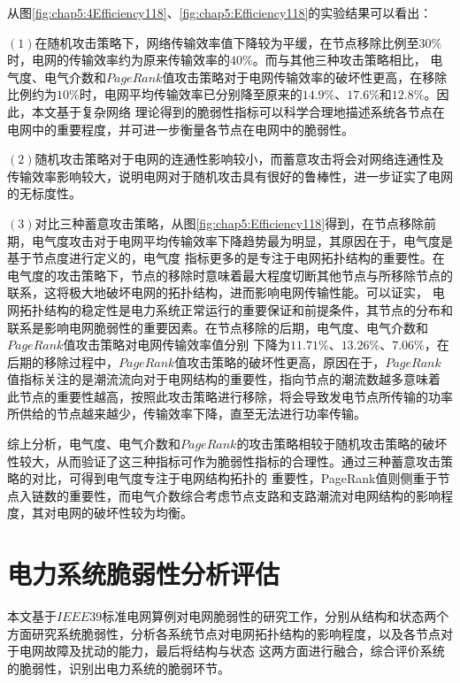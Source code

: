从图\ref{fig:chap5:4Efficiency118}、\ref{fig:chap5:Efficiency118}的实验结果可以看出：

$(1)$在随机攻击策略下，网络传输效率值下降较为平缓，在节点移除比例至$30\%$时，电网的传输效率约为原来传输效率的$40\%$。而与其他三种攻击策略相比，
电气度、电气介数和$PageRank$值攻击策略对于电网传输效率的破坏性更高，在移除比例约为$10\%$时，电网平均传输效率已分别降至原来的$14.9\%$、$17.6\%$和$12.8\%$。因此，本文基于复杂网络
理论得到的脆弱性指标可以科学合理地描述系统各节点在电网中的重要程度，并可进一步衡量各节点在电网中的脆弱性。

$(2)$随机攻击策略对于电网的连通性影响较小，而蓄意攻击将会对网络连通性及传输效率影响较大，说明电网对于随机攻击具有很好的鲁棒性，进一步证实了电网的无标度性。

$(3)$对比三种蓄意攻击策略，从图\ref{fig:chap5:Efficiency118}得到，在节点移除前期，电气度攻击对于电网平均传输效率下降趋势最为明显，其原因在于，电气度是基于节点度进行定义的，电气度
指标更多的是专注于电网拓扑结构的重要性。在电气度的攻击策略下，节点的移除时意味着最大程度切断其他节点与所移除节点的联系，这将极大地破坏电网的拓扑结构，进而影响电网传输性能。可以证实，
电网拓扑结构的稳定性是电力系统正常运行的重要保证和前提条件，其节点的分布和联系是影响电网脆弱性的重要因素。在节点移除的后期，电气度、电气介数和$PageRank$值攻击策略对电网传输效率值分别
下降为$11.71\%$、$13.26\%$、$7.06\%$，在后期的移除过程中，$PageRank$值攻击策略的破坏性更高，原因在于，$PageRank$值指标关注的是潮流流向对于电网结构的重要性，指向节点的潮流数越多意味着
此节点的重要性越高，按照此攻击策略进行移除，将会导致发电节点所传输的功率所供给的节点越来越少，传输效率下降，直至无法进行功率传输。

综上分析，电气度、电气介数和$PageRank$的攻击策略相较于随机攻击策略的破坏性较大，从而验证了这三种指标可作为脆弱性指标的合理性。通过三种蓄意攻击策略的对比，可得到电气度专注于电网结构拓扑的
重要性，PageRank值则侧重于节点入链数的重要性，而电气介数综合考虑节点支路和支路潮流对电网结构的影响程度，其对电网的破坏性较为均衡。


\section{电力系统脆弱性分析评估}
\label{sec:singleAssessment}

本文基于$IEEE39$标准电网算例对电网脆弱性的研究工作，分别从结构和状态两个方面研究系统脆弱性，分析各系统节点对电网拓扑结构的影响程度，以及各节点对于电网故障及扰动的能力，最后将结构与状态
这两方面进行融合，综合评价系统的脆弱性，识别出电力系统的脆弱环节。

